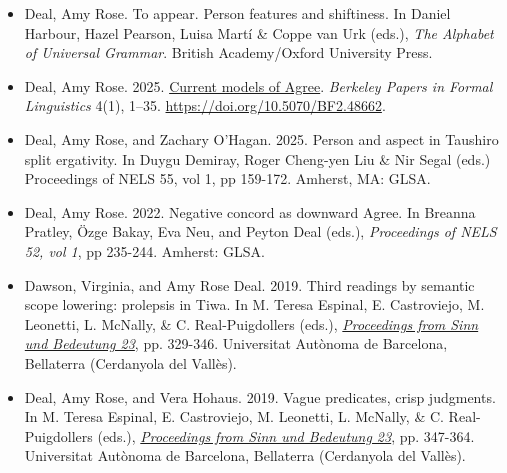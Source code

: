 \documentclass[12pt]{article}
\begin{document}
\begin{itemize}[labelsep=.5cm,leftmargin=0cm,itemindent=0cm]



\item Deal, Amy Rose.  To appear. Person features and shiftiness. In  Daniel Harbour, Hazel Pearson, Luisa Mart\'i \& Coppe van Urk (eds.), \emph{The Alphabet of Universal Grammar}. British Academy/Oxford University Press.

 \item Deal, Amy Rose.  2025. \href{https://escholarship.org/uc/item/9g76n758}{Current models of Agree}. \emph{Berkeley Papers in Formal Linguistics} 4(1), 1--35. \href{https://doi.org/10.5070/BF2.48662}{https://doi.org/10.5070/BF2.48662}. 
 
\item Deal, Amy Rose, and Zachary O'Hagan. 2025. Person and aspect in Taushiro split ergativity. In Duygu Demiray, Roger Cheng-yen Liu \& Nir Segal (eds.) Proceedings of NELS 55, vol 1, pp 159-172. Amherst, MA: GLSA. 

 



\item Deal, Amy Rose.  2022. Negative concord as downward Agree. In Breanna Pratley, \"Ozge Bakay, Eva Neu, and Peyton Deal (eds.), \emph{Proceedings of NELS 52, vol 1}, pp 235-244. Amherst: GLSA.


\item \new Dawson, Virginia, and Amy Rose Deal. 2019. Third readings by semantic scope lowering: prolepsis in Tiwa. In  M. Teresa Espinal, E. Castroviejo, M. Leonetti, L. McNally, \& C. Real-Puigdollers (eds.),  \href{https://semanticsarchive.net/Archive/Tg3ZGI2M/Proceedings23.html}{\emph{Proceedings from Sinn und Bedeutung 23}}, pp. 329-346. Universitat Aut\`onoma de Barcelona, Bellaterra (Cerdanyola del Vall\`es). 


\item \new Deal, Amy Rose, and Vera Hohaus. 2019. Vague predicates, crisp judgments. In  M. Teresa Espinal, E. Castroviejo, M. Leonetti, L. McNally, \& C. Real-Puigdollers (eds.),   \href{https://semanticsarchive.net/Archive/Tg3ZGI2M/Proceedings23.html}{\emph{Proceedings from Sinn und Bedeutung 23}}, pp. 347-364. Universitat Aut\`onoma de Barcelona, Bellaterra (Cerdanyola del Vall\`es). 


\end{itemize}
\end{document}
